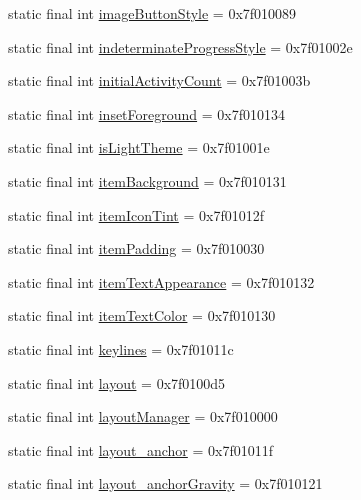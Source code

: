 \begin{CompactItemize}
\item 
static final int \hyperlink{classandroid_1_1support_1_1v4_1_1_r_1_1attr_b787b3860ec097d27cbab1145d9465cb}{imageButtonStyle} = 0x7f010089
\item 
static final int \hyperlink{classandroid_1_1support_1_1v4_1_1_r_1_1attr_dc6711d05312e6f9c0eb2d8b103ec6a3}{indeterminateProgressStyle} = 0x7f01002e
\item 
static final int \hyperlink{classandroid_1_1support_1_1v4_1_1_r_1_1attr_c055d8953fd09aed9237fb1006d58c7b}{initialActivityCount} = 0x7f01003b
\item 
static final int \hyperlink{classandroid_1_1support_1_1v4_1_1_r_1_1attr_00133cc665cd793fdc9c26ef4e822c57}{insetForeground} = 0x7f010134
\item 
static final int \hyperlink{classandroid_1_1support_1_1v4_1_1_r_1_1attr_6b0fb4a730781cf3f05c71c7f7ebb0b6}{isLightTheme} = 0x7f01001e
\item 
static final int \hyperlink{classandroid_1_1support_1_1v4_1_1_r_1_1attr_31e7fc58e7919766ef0e661a094e6b36}{itemBackground} = 0x7f010131
\item 
static final int \hyperlink{classandroid_1_1support_1_1v4_1_1_r_1_1attr_64e709cb6a5115de07252353b28e48dc}{itemIconTint} = 0x7f01012f
\item 
static final int \hyperlink{classandroid_1_1support_1_1v4_1_1_r_1_1attr_13769149d2e21783b5db7cc455fd1448}{itemPadding} = 0x7f010030
\item 
static final int \hyperlink{classandroid_1_1support_1_1v4_1_1_r_1_1attr_185b83793cd7f4bf0ffcd5de92c0ea36}{itemTextAppearance} = 0x7f010132
\item 
static final int \hyperlink{classandroid_1_1support_1_1v4_1_1_r_1_1attr_f6965b18d032fe8eed90aa34290998d8}{itemTextColor} = 0x7f010130
\item 
static final int \hyperlink{classandroid_1_1support_1_1v4_1_1_r_1_1attr_cf15c70dc6d4d00cf58f551e0995fc82}{keylines} = 0x7f01011c
\item 
static final int \hyperlink{classandroid_1_1support_1_1v4_1_1_r_1_1attr_6b3a9bdbfb64eb312a1689576443dce5}{layout} = 0x7f0100d5
\item 
static final int \hyperlink{classandroid_1_1support_1_1v4_1_1_r_1_1attr_86b921238d86f653417f6ecf6c9d30b3}{layoutManager} = 0x7f010000
\item 
static final int \hyperlink{classandroid_1_1support_1_1v4_1_1_r_1_1attr_4e6b802ebb8e8362127838504624cbd5}{layout\_\-anchor} = 0x7f01011f
\item 
static final int \hyperlink{classandroid_1_1support_1_1v4_1_1_r_1_1attr_a685bd7611f74a5280bd7de1c81ae326}{layout\_\-anchorGravity} = 0x7f010121

\end{CompactItemize}
